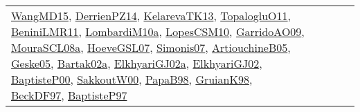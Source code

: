 {\begin{longtable}{lp{3cm}>{\raggedright}p{6cm}>{\raggedright}p{6cm}p{8cm}}
\href{articles/WangMD15.pdf}{WangMD15}\cite{WangMD15}, \href{papers/DerrienPZ14.pdf}{DerrienPZ14}\cite{DerrienPZ14}, \href{papers/KelarevaTK13.pdf}{KelarevaTK13}\cite{KelarevaTK13}, \href{articles/TopalogluO11.pdf}{TopalogluO11}\cite{TopalogluO11}, \href{articles/BeniniLMR11.pdf}{BeniniLMR11}\cite{BeniniLMR11}, \href{articles/LombardiM10a.pdf}{LombardiM10a}\cite{LombardiM10a}, \href{articles/LopesCSM10.pdf}{LopesCSM10}\cite{LopesCSM10}, \href{articles/GarridoAO09.pdf}{GarridoAO09}\cite{GarridoAO09}, \href{papers/MouraSCL08a.pdf}{MouraSCL08a}\cite{MouraSCL08a}, \href{papers/HoeveGSL07.pdf}{HoeveGSL07}\cite{HoeveGSL07}, \href{articles/Simonis07.pdf}{Simonis07}\cite{Simonis07}, \href{papers/ArtiouchineB05.pdf}{ArtiouchineB05}\cite{ArtiouchineB05}, \href{papers/Geske05.pdf}{Geske05}\cite{Geske05}, \href{papers/Bartak02a.pdf}{Bartak02a}\cite{Bartak02a}, \href{papers/ElkhyariGJ02a.pdf}{ElkhyariGJ02a}\cite{ElkhyariGJ02a}, \href{papers/ElkhyariGJ02.pdf}{ElkhyariGJ02}\cite{ElkhyariGJ02}, \href{articles/BaptisteP00.pdf}{BaptisteP00}\cite{BaptisteP00}, \href{articles/SakkoutW00.pdf}{SakkoutW00}\cite{SakkoutW00}, \href{articles/PapaB98.pdf}{PapaB98}\cite{PapaB98}, \href{papers/GruianK98.pdf}{GruianK98}\cite{GruianK98}, \href{papers/BeckDF97.pdf}{BeckDF97}\cite{BeckDF97}, \href{papers/BaptisteP97.pdf}{BaptisteP97}\cite{BaptisteP97}\\

\end{longtable}}
